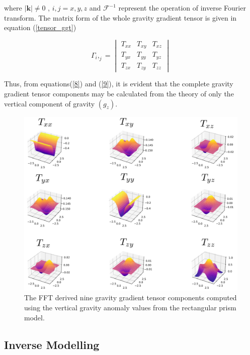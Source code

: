 \documentclass[a4paper,11pt]{article}
\begin{document}
\noindent where $|\textbf{k}| \neq 0 $ , $i,j = x,y,z$ and  $\mathcal{F}^{-1}$ represent the operation of inverse Fourier transform. The matrix form of the whole gravity gradient tensor is given in equation (\ref{tensor_ggt})

\begin{equation} \label{tensor_ggt}
\textbf{$\Gamma_i,_j$}=\begin{vmatrix} %
T_{xx} & T_{xy} & T_{xz} \\
T_{yx} & T_{yy} & T_{yz} \\
T_{zx } & T_{zy }& T_{zz}
\end{vmatrix}
\end{equation}    

\noindent Thus, from equations(\ref{8}) and (\ref{9}), it is evident that the complete gravity gradient tensor components may be calculated from the theory of only the vertical component of gravity $(g_{z})$.

\begin{figure}
    \centering
    \includegraphics[scale=2.5]{plots/GGT.png}
    \caption{%
    The FFT derived nine gravity gradient tensor components computed using the vertical
gravity anomaly values from the rectangular prism model.}
\end{figure}

\subsection{Inverse Modelling}
\end{document}
